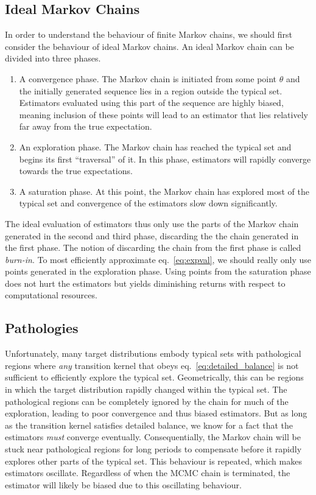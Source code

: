 \subsection{Ideal Markov Chains}
In order to understand the behaviour of finite Markov chains, we should first 
consider the behaviour of ideal Markov chains.
An ideal Markov chain can be divided into three phases.
\begin{enumerate}
    \item A convergence phase. The Markov chain is initiated from some point $\theta$ and the initially generated sequence
    lies in a region outside the typical set. Estimators evaluated using this part of the sequence are highly biased,
    meaning inclusion of these points will lead to an estimator that lies relatively far away from the true expectation.
    \item An exploration phase. The Markov chain has reached the typical set and begins its first ``traversal'' of it.
    In this phase, estimators will rapidly converge towards the true expectations.
    \item A saturation phase. At this point, the Markov chain has explored most of the typical set and convergence
    of the estimators slow down significantly. 
\end{enumerate}
The ideal evaluation of estimators thus only use the parts of the Markov chain generated in the second and third phase, discarding the
the chain generated in the first phase. The notion of discarding the chain from the first phase is called \textit{burn-in}.
To most efficiently approximate eq.~\eqref{eq:expval}, we should really only use points generated in the exploration phase.
Using points from the saturation phase does not hurt the estimators but yields diminishing returns
with respect to computational resources.

\subsection{Pathologies}
Unfortunately, many target distributions embody typical sets with pathological regions where \textit{any} 
transition kernel that obeys eq.~\eqref{eq:detailed_balance} is not sufficient to efficiently explore the typical set.
Geometrically, this can be regions in which the target distribution rapidly changed within
the typical set.
The pathological regions can be completely ignored by the chain for much of the exploration,
leading to poor convergence and thus biased estimators. But as long as the transition kernel
satisfies detailed balance, we know for a fact that the estimators \textit{must} converge eventually.
Consequentially, the Markov chain will be stuck near pathological regions for long periods to compensate
before it rapidly explores other parts of the typical set. This behaviour is repeated, 
which makes estimators oscillate. Regardless of when the MCMC chain is terminated, the estimator will likely be biased due
to this oscillating behaviour.

